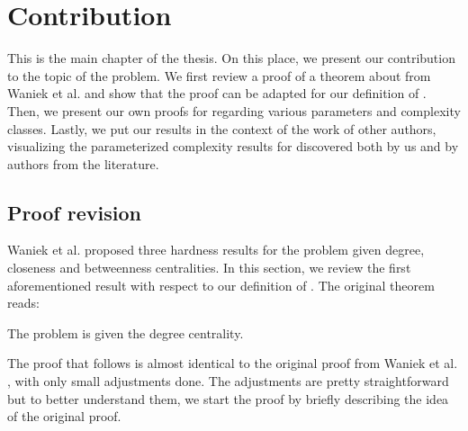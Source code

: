 \chapter{Contribution}\label{chapter:contribution}

This is the main chapter of the thesis.
On this place, we present our contribution to the topic of the \HL problem.
We first review a proof of a theorem about \HLdeg from Waniek et al. \cite{Waniek2017} and show
that the proof can be adapted for our definition of \HL.
Then, we present our own proofs for \HLdeg regarding various parameters and complexity classes.
Lastly, we put our results in the context of the work of other authors,
visualizing the parameterized complexity results for \HLdeg discovered both by us and by authors
from the literature.


\section{Proof revision}\label{section:proofRevision}

Waniek et al. \cite{Waniek2021full} proposed three hardness results for the \HL problem given degree, closeness and betweenness
centralities. In this section, we review the first aforementioned result with respect to our definition of \HLshort.
The original theorem reads:

\begin{theorem}
    The \HL problem is \NPc given the degree centrality.
\end{theorem}

The proof that follows is almost identical to the original proof from Waniek et al. \cite{Waniek2021full},
with only small adjustments done.
The adjustments are pretty straightforward but to better understand them,
we start the proof by briefly describing the idea of the original proof.

